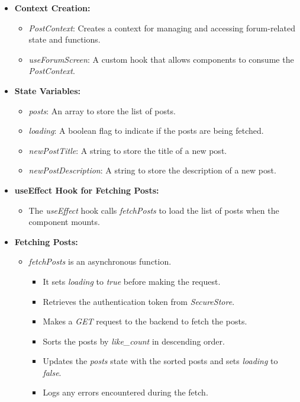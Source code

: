 \begin{itemize}
    \item \textbf{Context Creation:}
    \begin{itemize}
        \item \textit{PostContext}: Creates a context for managing and accessing forum-related state and functions.
        \item \textit{useForumScreen}: A custom hook that allows components to consume the \textit{PostContext}.
    \end{itemize}

    \item \textbf{State Variables:}
    \begin{itemize}
        \item \textit{posts}: An array to store the list of posts.
        \item \textit{loading}: A boolean flag to indicate if the posts are being fetched.
        \item \textit{newPostTitle}: A string to store the title of a new post.
        \item \textit{newPostDescription}: A string to store the description of a new post.
    \end{itemize}

    \item \textbf{useEffect Hook for Fetching Posts:}
    \begin{itemize}
        \item The \textit{useEffect} hook calls \textit{fetchPosts} to load the list of posts when the component mounts.
    \end{itemize}

    \item \textbf{Fetching Posts:}
    \begin{itemize}
        \item \textit{fetchPosts} is an asynchronous function.
        \begin{itemize}
            \item It sets \textit{loading} to \textit{true} before making the request.
            \item Retrieves the authentication token from \textit{SecureStore}.
            \item Makes a \textit{GET} request to the backend to fetch the posts.
            \item Sorts the posts by \textit{like\_count} in descending order.
            \item Updates the \textit{posts} state with the sorted posts and sets \textit{loading} to \textit{false}.
            \item Logs any errors encountered during the fetch.
        \end{itemize}
    \end{itemize}


\end{itemize}
